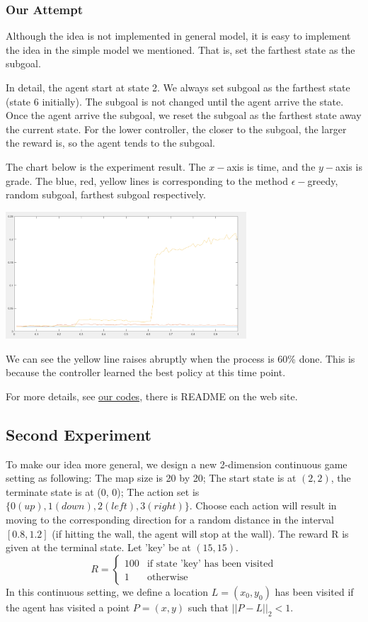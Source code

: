\documentclass{article}
\begin{document}
\begin{spacing}{1.1}
    \subsubsection{Our Attempt}

    Although the idea is not implemented in general model, it is easy to implement the idea in the simple model we mentioned. That is, set the farthest state as the subgoal.

    In detail, the agent start at state 2. We always set subgoal as the farthest state (state 6 initially). The subgoal is not changed until the agent arrive the state. Once the agent arrive the subgoal, we reset the subgoal as the farthest state away the current state. For the lower controller, the closer to the subgoal, the larger the reward is, so the agent tends to the subgoal.

    The chart below is the experiment result. The $x-$axis is time, and the $y-$axis is grade. The blue, red, yellow lines is corresponding to the method $\epsilon-$greedy, random subgoal, farthest subgoal respectively.

    \includegraphics[width=90mm]{1.png}

    We can see the yellow line raises abruptly when the process is 60\% done. This is because the controller learned the best policy at this time point.

    For more details, see \href{https://github.com/faebdc/AI-Project}{our codes}, there is README on the web site.

    \subsection{Second Experiment}
    To make our idea more general, we design a new 2-dimension continuous game setting as following: The map size is 20 by 20; The start state is at $(2, 2)$, the terminate state is at (0, 0); The action set is $\{0(up), 1(down), 2(left), 3(right)\}$. Choose each action will result in moving to the corresponding direction for a random distance in the interval $[0.8, 1.2]$ (if hitting the wall, the agent will stop at the wall). The reward R is given at the terminal state. Let 'key' be at $(15, 15)$.
    $$R = \begin{cases}
        100 & \text{if state 'key' has been visited}\\
        1 & \text{otherwise}
    \end{cases}$$
    In this continuous setting, we define a location $L = (x_0, y_0)$ has been visited if the agent has visited a point $P = (x, y)$ such that $||P - L||_2 < 1$.


\end{spacing}
\end{document}
